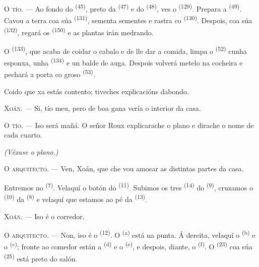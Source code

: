 \textsc{O tío}. --- Ao fondo do  \textsuperscript{(45)}, preto da
 \textsuperscript{(47)} e do 
\textsuperscript{(48)}, ves o  \textsuperscript{(129)}. Prepara a
 \textsuperscript{(49)}. Cavou a terra coa súa 
\textsuperscript{(131)}, sementa sementes e rastra co 
\textsuperscript{(130)}. Despois, coa súa 
\textsuperscript{(132)}, regará os  \textsuperscript{(150)} e as
plantas irán medrando.

O  \textsuperscript{(133)}, que acaba de coidar o cabalo e de lle
dar a comida, limpa o  \textsuperscript{(52)} cunha esponxa, unha
 \textsuperscript{(134)} e un balde de auga. Despois volverá
metelo na cocheira e pechará a porta co groso 
\textsuperscript{(53)}.

Coido que xa estás contento; tiveches explicacións dabondo.

\textsc{Xoán}. --- Si, tío meu, pero de boa gana vería o interior da casa.

\textsc{O tío}. --- Iso será mañá. O señor Roux explicarache o plano e dirache o nome
de cada cuarto.

\VUsaut{3.0mm}
\VUsaut{2.4mm}

{\centering\textit{(Véxase o plano.)}\par}
\VUsaut{2.4mm}

\textsc{O arquitecto}. --- Ven, Xoán, que che vou amosar as distintas partes da
casa.

Entremos no  \textsuperscript{(7)}. Velaquí o botón do
 \textsuperscript{(11)}. Subimos os tres 
\textsuperscript{(14)} do  \textsuperscript{(9)}, cruzamos o
 \textsuperscript{(10)} da 
\textsuperscript{(8)} e velaquí que estamos ao pé da 
\textsuperscript{(13)}.

\textsc{Xoán}. --- Iso é o corredor.

\textsc{O arquitecto}. --- Non, iso é o  \textsuperscript{(12)}. O
 \textsuperscript{(a)} está na punta. Á dereita, velaquí o
 \textsuperscript{(b)} e o  \textsuperscript{(c)};
fronte ao comedor están a  \textsuperscript{(d)} e o  \textsuperscript{(e)}, e despois, diante, o 
\textsuperscript{(f)}. O  \textsuperscript{(23)} coa súa
 \textsuperscript{(25)} está preto do salón.

